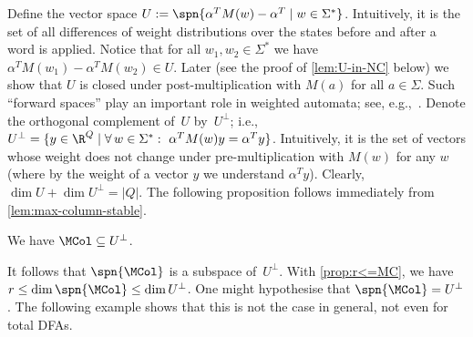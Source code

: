 \noindent
Define the vector space $U := \spn{\alpha^T M(w) - \alpha^T \mid w \in \Sigma^*}$. Intuitively, it is the set of all differences of weight distributions over the states before and after a word is applied.
Notice that for all $w_1, w_2 \in \Sigma^*$ we have $\alpha^T M(w_1) - \alpha^T M(w_2) \in U$.
Later (see the proof of \autoref{lem:U-in-NC} below) we show that $U$ is closed under post-multiplication with $M(a)$ for all $a \in \Sigma$.
Such ``forward spaces'' play an important role in weighted automata; see, e.g.,~\cite{KieferWeighted20}.
Denote the orthogonal complement of~$U$ by~$U^\bot$; i.e., $U^\bot = \{y \in \R^Q \mid \forall\,w \in \Sigma^*: \ \alpha^T M(w) y = \alpha^T y\}$. Intuitively, it is the set of vectors whose weight does not change under pre-multiplication with $M(w)$ for any $w$ (where by the weight of a vector $y$ we understand $\alpha^T y$).
Clearly, $\dim U + \dim U^\bot = |Q|$.
The following proposition follows immediately from \autoref{lem:max-column-stable}.

\begin{prop} \label{prop:MC<=V}
We have $\MCol \subseteq U^\bot$.
\end{prop}

\noindent
It follows that $\spn{\MCol}$ is a subspace of~$U^\bot$.
With \autoref{prop:r<=MC}, we have $r \le \dim \spn{\MCol} \le \dim U^\bot$.
One might hypothesise that $\spn{\MCol} = U^\bot$.
The following example  shows that this is not the case in general, not even for total DFAs.

